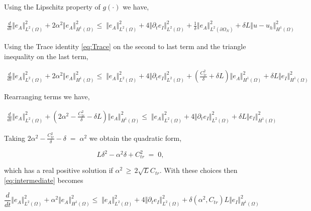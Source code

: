 \documentclass[10pt]{report}
\numberwithin{equation}{section}
\begin{document}
Using the Lipschitz property of $g(\cdot)$ we have,

\begin{align}
\frac{d}{dt} \Vert e_{A} \Vert^{2}_{L^{2}(\Omega)}  +  2\alpha^{2} \Vert e_{A} \Vert_{H^{1}(\Omega)}^{2}  \leq \; \Vert  e_{A} \Vert_{L^{2}(\Omega)}^{2} + 4 \Vert \partial_{t} e_{I} \Vert^{2}_{L^{2}(\Omega)} + \frac{1}{\delta} \Vert  e_{A} \Vert_{L^{2}(\partial \Omega_{N})}^{2} + \delta L \Vert u -u_{h} \Vert_{H^{1}(\Omega)}^{2}
\end{align} 


Using the Trace identity \eqref{eq:Trace} on the second to last term and the triangle inequality on the last term,

\begin{align}
\frac{d}{dt} \Vert e_{A} \Vert^{2}_{L^{2}(\Omega)}  +  2\alpha^{2} \Vert e_{A} \Vert_{H^{1}(\Omega)}^{2}  \leq \; \Vert  e_{A} \Vert_{L^{2}(\Omega)}^{2} + 4 \Vert \partial_{t} e_{I} \Vert^{2}_{L^{2}(\Omega)} + \left(\frac{C_{tr}^{2}}{\delta} + \delta L \right) \Vert  e_{A} \Vert_{H^{1}(\Omega)}^{2} + \delta L \Vert e_{I} \Vert_{H^{1}(\Omega)}^{2}
\end{align} 



Rearranging terms we have,


\begin{align}
\frac{d}{dt} \Vert e_{A} \Vert^{2}_{L^{2}(\Omega)}  +  \left(2\alpha^{2} - \frac{C_{tr}^{2}}{\delta} - \delta L \right) \Vert e_{A} \Vert_{H^{1}(\Omega)}^{2}  \leq \; \Vert  e_{A} \Vert_{L^{2}(\Omega)}^{2} + 4 \Vert \partial_{t} e_{I} \Vert^{2}_{L^{2}(\Omega)} + \delta L \Vert e_{I} \Vert_{H^{1}(\Omega)}^{2} \label{eq:intermediate}
\end{align} 


Taking $ 2\alpha^{2} - \frac{C_{tr}^{2}}{\delta} - \delta \; = \; \alpha^{2}$ we obtain the quadratic form,


\begin{equation}
L \delta^{2} - \alpha^{2} \delta + C_{tr}^{2} \; = \; 0,
\end{equation}


which has a real positive solution if $\alpha^{2} \, \geq \, 2 \sqrt{L} C_{tr}$.  With these choices then \eqref{eq:intermediate} becomes


\begin{equation}
\frac{d}{dt} \Vert e_{A} \Vert^{2}_{L^{2}(\Omega)}  +  \alpha^{2}  \Vert e_{A} \Vert_{H^{1}(\Omega)}^{2}  \leq \; \Vert  e_{A} \Vert_{L^{2}(\Omega)}^{2} + 4 \Vert \partial_{t} e_{I} \Vert^{2}_{L^{2}(\Omega)} + \delta \left( \alpha^{2}, C_{tr} \right) L \Vert e_{I} \Vert_{H^{1}(\Omega)}^{2} 
\end{equation}
\end{document}
